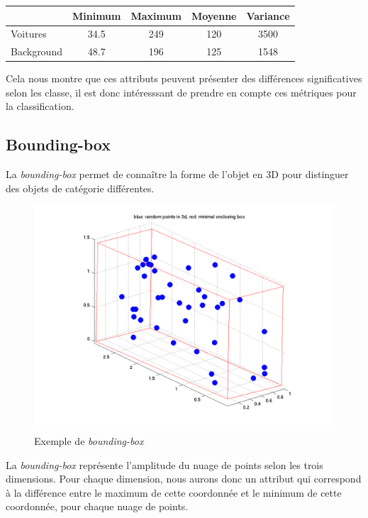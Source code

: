 		\begin{center}
			\begin{tabular}{|l||c|c|c|c|}
			  \hline
			  & Minimum & Maximum & Moyenne & Variance \\
			  \hline
			  Voitures & 34.5 & 249 & 120 & 3500 \\
			  Background & 48.7 & 196 & 125 & 1548 \\
			  \hline
			\end{tabular}
		\end{center}


		Cela nous montre que ces attributs peuvent présenter des différences significatives selon les classe, il est donc intéresssant de prendre en compte ces métriques pour la classification.

	\subsection{Bounding-box}
		La \emph{bounding-box} permet de connaître la forme de l'objet en 3D pour distinguer des objets de catégorie différentes.

		\begin{figure}[H]
			\centering
			\includegraphics[scale=0.6]{images/bounding-box.png}
			\caption{Exemple de \emph{bounding-box}}
			\label{fig:image}
		\end{figure}

		La \emph{bounding-box} représente l'amplitude du nuage de points selon les trois dimensions. Pour chaque dimension, nous aurons donc un attribut qui correspond à la différence entre le maximum de cette coordonnée et le minimum de cette coordonnée, pour chaque nuage de points.\\


